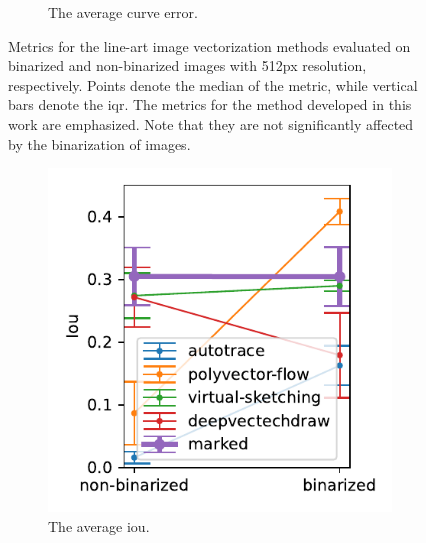 \begin{figure}[h]
\begin{subfigure}{.3\textwidth}
    \caption{The average curve error.}
\end{subfigure}
    \caption{Metrics for the line-art image vectorization methods evaluated on binarized and non-binarized images with 512px resolution, respectively. Points denote the median of the metric, while vertical bars denote the \gls{iqr}. The metrics for the method developed in this work are emphasized. Note that they are not significantly affected by the binarization of images.}
    \label{fig:binarization_comparison}
\end{figure}

\begin{figure}[h]
    \centering
    \begin{subfigure}{.3\textwidth}
    \centering
    \includegraphics[width=\textwidth]{graphics/eval/iou_binarization_sketchbench.pdf}
    \caption{The average \gls{iou}.}
\end{subfigure}
    \begin{subfigure}{.3\textwidth}
    \centering

\end{subfigure}
\end{figure}
